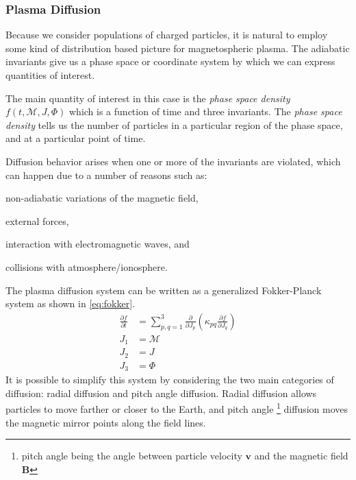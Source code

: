 \subsubsection*{Plasma Diffusion}

Because we consider populations of charged particles, it is natural to employ some kind of 
distribution based picture for magnetospheric plasma. The adiabatic invariants give us a phase 
space or coordinate system by which we can express quantities of interest. 

The main quantity of interest in this case is the \emph{phase space density} 
$f(t, \mathcal{M}, J, \Phi)$ which is a function of time and three invariants. The 
\emph{phase space density} tells us the number of particles in a particular region of the phase 
space, and at a particular point of time.

Diffusion behavior arises when one or more of the invariants are violated, which can happen due to 
a number of reasons such as: 
%
\begin{enumerate*}
    \item non-adiabatic variations of the magnetic field, 
    \item external forces, 
    \item interaction with electromagnetic waves, and 
    \item collisions with atmosphere/ionosphere. 
\end{enumerate*}
%
The plasma diffusion system \citep{schulz2012particle} can be written as a generalized 
Fokker-Planck system as shown in \cref{eq:fokker}.
%
\begin{align}\label{eq:fokker}
    \frac{\partial{f}}{\partial{t}} &= \sum^{3}_{p,q = 1}
    \frac{\partial}{\partial{J_{p}}} \left( \kappa_{pq}
    \frac{\partial{f}}{\partial{J_{q}}} \right) \\
    J_1 &= \mathcal{M} \\
    J_2 &= J \\
    J_{3} &= \Phi
\end{align}
%
It is possible to simplify this system by considering the two main categories of diffusion: radial 
diffusion and pitch angle diffusion. Radial diffusion allows particles to move farther or closer 
to the Earth, and pitch angle \footnote{pitch angle being the angle between particle velocity 
$\mathbf{v}$ and the magnetic field $\mathbf{B}$} diffusion moves the magnetic mirror points along 
the field lines.

